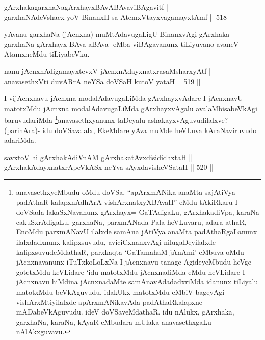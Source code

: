 
\begin{shl}
gArxhakagarxhaNagArxhayxBAvABAvaviBAgavitf | \\
garxhaNAdeVshacx yoV BinanxH sa AtemxVtayxvagamayxtAmf \hfill||  518 ||  
\end{shl}

\begin{artha}
yAvanu garxhaNa (jAcnxna) muMtAdavugaLigU BinanxvAgi gArxhaka-garxhaNa-gArxhayx-BAva-aBAva- eMba viBAgavanunx tiLiyuvano avaneV AtamxneMdu tiLiyabeVku.
\end{artha}


\begin{shl}
nanu jAcnxnAdigamayxtevxV jAcnxnAdayxnatxrasaMsharxyAtf | \\
anavasethxVti duvARrA neYSa doVSaH kutoV yataH \hfill||  519 ||  
\end{shl}

\begin{artha}
I vijAcnxnavu jAcnxna modalAdavugaLiMda gArxhayxvAdare I jAcnxnavU matotxMdu jAcnxna modalAdavugaLiMda gArxhayxvAgalu avalaMbisabeVkAgi baruvudariMda \footnote{anavasethxyeMbudu oMdu doVSa, ``apArxmANika-anaMta-sajAtiVya padAthaR kalapxnAdhArA vishArxnatxyXBAvaH'' eMdu tAkiRkaru I doVSada lakaSxNavanunx gArxhayx= GaTAdigaLu, gArxhakadiVpa, karaNa cakuSxrAdigaLu, garxhaNa, parxmANada Pala heVLuvaru, adara athaR, EnoMdu parxmANavU ilalxde samAna jAtiVya anaMta padAthaRgaLanunx ilalxdadxnunx kalipxsuvudu, aviciCxnanxvAgi nilugaDeyilalxde kalipxsuvudeMdathaR, parxkaqta `GaTamahaM jAnAmi' eMbuva oMdu jAcnxnavanunx iTuTxkoLoLxNa I jAcnxnavu tanage AgideyeMbudu heVge gotetxMdu keVLidare `idu matotxMdu jAcnxnadiMda eMdu heVLidare I jAcnxnavu hiMdina jAcnxnadaMte samAnavAdadadxriMda idanunx tiLiyalu matotxMdu beVkAguvudu, idakUkx matotxMdu eMbiV bageyAgi vishArxMtiyilalxde apArxmANikavAda padAthaRkalapxne mADabeVkAguvudu. ideV doVSaveMdathaR. idu nAlukx, gArxhaka, garxhaNa, karaNa, kAyaR-eMbudara mUlaka anavasethxgaLu nAlAkxguvavu.}anavasethxyanunx taDeyalu ashakayxvAguvudilalxve? (parihAra)- idu doVSavalalx, EkeMdare yAva muMde heVLuva kAraNaviruvudo adariMda.
\end{artha}

\begin{shl}
savxtoV hi gArxhakAdiVnAM gArxhakatAvxdisididhxtaH ||  \\
gArxhakAdayxnatxrApeVkASx neYva sAyxdavisheVSataH \hfill||  520 ||  
\end{shl}

